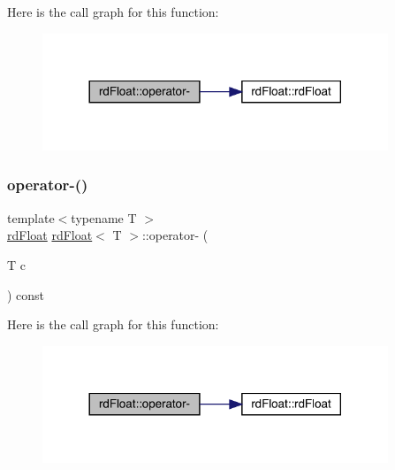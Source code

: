 Here is the call graph for this function\+:\nopagebreak
\begin{figure}[H]
\begin{center}
\leavevmode
\includegraphics[width=293pt]{structrd_float_a93cac969ebddfb3a283beca812bd3439_cgraph}
\end{center}
\end{figure}
\mbox{\label{structrd_float_acbefb7030e7f4f743eb167c606850549}} 
\subsubsection{\texorpdfstring{operator-\/()}{operator-()}\hspace{0.1cm}{\footnotesize\ttfamily [2/3]}}
{\footnotesize\ttfamily template$<$typename T $>$ \\
\mbox{\hyperlink{structrd_float}{rd\+Float}} \mbox{\hyperlink{structrd_float}{rd\+Float}}$<$ T $>$\+::operator-\/ (\begin{DoxyParamCaption}\item[{T}]{c }\end{DoxyParamCaption}) const\hspace{0.3cm}{\ttfamily [inline]}}

Here is the call graph for this function\+:\nopagebreak
\begin{figure}[H]
\begin{center}
\leavevmode
\includegraphics[width=293pt]{structrd_float_acbefb7030e7f4f743eb167c606850549_cgraph}
\end{center}
\end{figure}
\mbox{\label{structrd_float_ae14557d9cdc0da5973748908c177b458}} 
